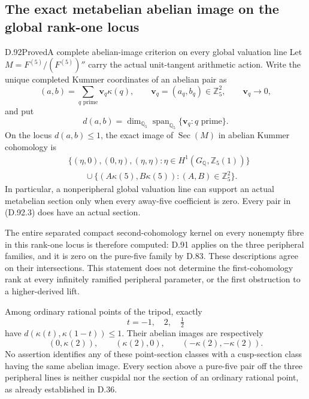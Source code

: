 \subsection{The exact metabelian abelian image on the global rank-one locus}

\begin{statement}{D.92}{Proved}{A complete abelian-image criterion on every global valuation line}
Let \(M=F^{(5)}/(F^{(5)})''\) carry the actual unit-tangent
arithmetic action. Write the unique completed Kummer coordinates
of an abelian pair as
\[
 (a,b)=\sum_{q\text{ prime}}\mathbf v_q\kappa(q),
 \qquad \mathbf v_q=(a_q,b_q)\in\mathbb Z_5^2,
 \qquad \mathbf v_q\longrightarrow0,
                                                               \tag{D.92.1}
\]
and put
\[
 d(a,b)=\dim_{\mathbb Q_5}
       \operatorname{span}_{\mathbb Q_5}\{\mathbf v_q:q\text{ prime}\}.
                                                               \tag{D.92.2}
\]
On the locus \(d(a,b)\le1\), the exact image of
\(\operatorname{Sec}(M)\) in abelian Kummer cohomology is
\[
 \begin{aligned}
 &\{(\eta,0),(0,\eta),(\eta,\eta):
          \eta\in H^1(G_{\mathbb Q},\mathbb Z_5(1))\}\\
 &\qquad{}\cup
 \{(A\kappa(5),B\kappa(5)):(A,B)\in\mathbb Z_5^2\}.
 \end{aligned}                                                \tag{D.92.3}
\]
In particular, a nonperipheral global valuation line can
support an actual metabelian section only when every
away-five coefficient is zero. Every pair in (D.92.3)
does have an actual section.

The entire separated compact second-cohomology kernel on
every nonempty fibre in this rank-one locus is therefore
computed: D.91 applies on the three peripheral families,
and it is zero on the pure-five family by D.83. These
descriptions agree on their intersections. This statement
does not determine the first-cohomology rank at every
infinitely ramified peripheral parameter, or the first
obstruction to a higher-derived lift.

Among ordinary rational points of the tripod, exactly
\[
                         t=-1,\quad 2,\quad \tfrac12
                                                               \tag{D.92.4}
\]
have \(d(\kappa(t),\kappa(1-t))\le1\). Their abelian
images are respectively
\[
       (0,\kappa(2)),\qquad(\kappa(2),0),\qquad
                         (-\kappa(2),-\kappa(2)).
                                                               \tag{D.92.5}
\]
No assertion identifies any of these point-section classes
with a cusp-section class having the same abelian image.
Every section above a pure-five pair off the three
peripheral lines is neither cuspidal nor the section of
an ordinary rational point, as already established in D.36.
\end{statement}

